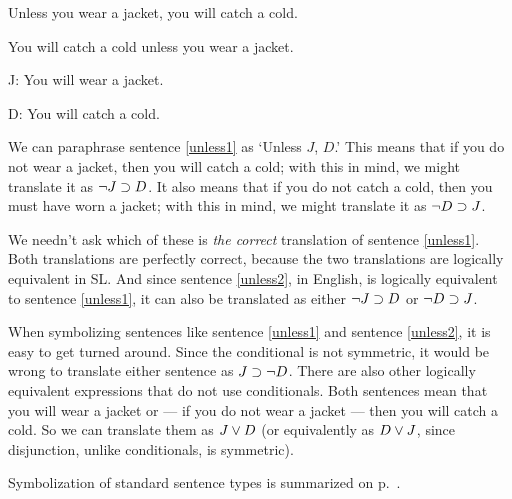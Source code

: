 \begin{earg}
\item[\ex{unless1}] Unless you wear a jacket, you will catch a cold. 
\item[\ex{unless2}] You will catch a cold unless you wear a jacket. 
\end{earg}


\begin{ekey}
\item[J:] You will wear a jacket.
\item[D:] You will catch a cold.
\end{ekey}

We can paraphrase sentence \ref{unless1} as `Unless $J$, $D$.' This means that if you do not wear a jacket, then you will catch a cold; with this in mind, we might translate it as $\neg J \supset D$. It also means that if you do not catch a cold, then you must have worn a jacket; with this in mind, we might translate it as $\neg D \supset J$.

We needn't ask which of these is \emph{the correct} translation of sentence \ref{unless1}. Both translations are perfectly correct, because the two translations are logically equivalent in SL. And since sentence \ref{unless2}, in English, is logically equivalent to sentence \ref{unless1}, it can also be translated as either $\neg J \supset D$ or $\neg D \supset J$.

When symbolizing sentences like sentence \ref{unless1} and sentence \ref{unless2}, it is easy to get turned around. Since the conditional is not symmetric, it would be wrong to translate either sentence as $J \supset \neg D$. There are also other logically equivalent expressions that do not use conditionals. Both sentences mean that you will wear a jacket or --- if you do not wear a jacket --- then you will catch a cold. So we can translate them as $J \vee D$ (or equivalently as $D \vee J$, since disjunction, unlike conditionals, is symmetric).



Symbolization of standard sentence types is summarized on p.~\pageref{app.notation}.





